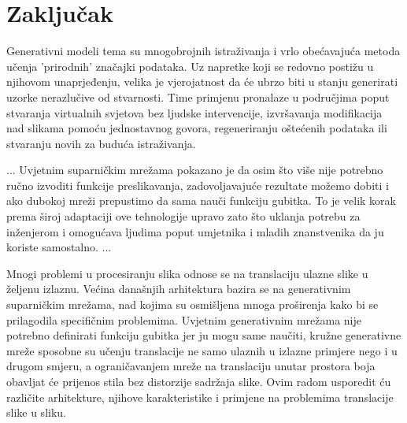 \documentclass[lmodern, utf8, seminar]{fer}
\begin{document}
\chapter{Zaključak}
Generativni modeli tema su mnogobrojnih istraživanja i vrlo obećavajuća metoda učenja 'prirodnih' značajki podataka. Uz napretke koji se redovno postižu u njihovom unaprjeđenju, velika je vjerojatnost da će ubrzo biti u stanju generirati uzorke nerazlučive od stvarnosti. Time primjenu pronalaze u područjima poput stvaranja virtualnih svjetova bez ljudske intervencije, izvršavanja modifikacija nad slikama pomoću jednostavnog govora, regeneriranju oštećenih podataka ili stvaranju novih za buduća istraživanja.
\newline

...
Uvjetnim suparničkim mrežama pokazano je da osim što više nije potrebno ručno izvoditi funkcije preslikavanja, zadovoljavajuće rezultate možemo dobiti i ako dubokoj mreži prepustimo da sama nauči funkciju gubitka. To je velik korak prema široj adaptaciji ove tehnologije upravo zato što uklanja potrebu za inženjerom i omogućava ljudima poput umjetnika i mladih znanstvenika da ju koriste samostalno.
...
\newline





\begin{sazetak}
Mnogi problemi u procesiranju slika odnose se na translaciju ulazne slike u željenu izlaznu. Većina današnjih arhitektura bazira se na generativnim suparničkim mrežama, nad kojima su osmišljena mnoga proširenja kako bi se prilagodila specifičnim problemima. Uvjetnim generativnim mrežama nije potrebno definirati funkciju gubitka jer ju mogu same naučiti, kružne generativne mreže sposobne su učenju translacije ne samo ulaznih u izlazne primjere nego i u drugom smjeru, a ograničavanjem mreže na translaciju unutar prostora boja obavljat će prijenos stila bez distorzije sadržaja slike. Ovim radom usporedit ću različite arhitekture, njihove karakteristike i primjene na problemima translacije slike u sliku.

\end{sazetak}

\begin{abstract}

\end{abstract}
\end{document}
